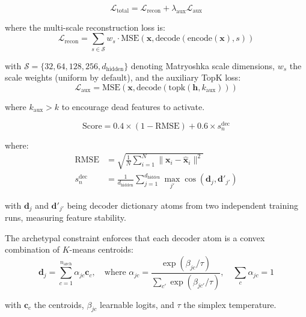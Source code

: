 
\begin{equation}
\mathcal{L}_{\text{total}} = \mathcal{L}_{\text{recon}} + \lambda_{\text{aux}} \mathcal{L}_{\text{aux}}
\label{eq:sae_loss}
\end{equation}

where the multi-scale reconstruction loss is:
\begin{equation}
\mathcal{L}_{\text{recon}} = \sum_{s \in \mathcal{S}} w_s \cdot \text{MSE}(\mathbf{x}, \text{decode}(\text{encode}(\mathbf{x}), s))
\label{eq:matryoshka_loss}
\end{equation}

with $\mathcal{S} = \{32, 64, 128, 256, d_{\text{hidden}}\}$ denoting Matryoshka scale dimensions, $w_s$ the scale weights (uniform by default), and the auxiliary TopK loss:
\begin{equation}
\mathcal{L}_{\text{aux}} = \text{MSE}(\mathbf{x}, \text{decode}(\text{topk}(\mathbf{h}, k_{\text{aux}})))
\label{eq:aux_loss}
\end{equation}

where $k_{\text{aux}} > k$ to encourage dead features to activate.

\begin{equation}
\text{Score} = 0.4 \times (1 - \text{RMSE}) + 0.6 \times s_n^{\text{dec}}
\label{eq:composite_score}
\end{equation}

where:
\begin{align}
\text{RMSE} &= \sqrt{\frac{1}{N} \sum_{i=1}^{N} \|\mathbf{x}_i - \hat{\mathbf{x}}_i\|^2} \\
s_n^{\text{dec}} &= \frac{1}{d_{\text{hidden}}} \sum_{j=1}^{d_{\text{hidden}}} \max_{j'} \cos(\mathbf{d}_j, \mathbf{d}'_{j'})
\end{align}

with $\mathbf{d}_j$ and $\mathbf{d}'_{j'}$ being decoder dictionary atoms from two independent training runs, measuring feature stability.

The archetypal constraint enforces that each decoder atom is a convex combination of $K$-means centroids:
\begin{equation}
\mathbf{d}_j = \sum_{c=1}^{n_{\text{arch}}} \alpha_{jc} \mathbf{c}_c, \quad \text{where } \alpha_{jc} = \frac{\exp(\beta_{jc}/\tau)}{\sum_{c'} \exp(\beta_{jc'}/\tau)}, \quad \sum_c \alpha_{jc} = 1
\label{eq:archetypal}
\end{equation}

with $\mathbf{c}_c$ the centroids, $\beta_{jc}$ learnable logits, and $\tau$ the simplex temperature.
